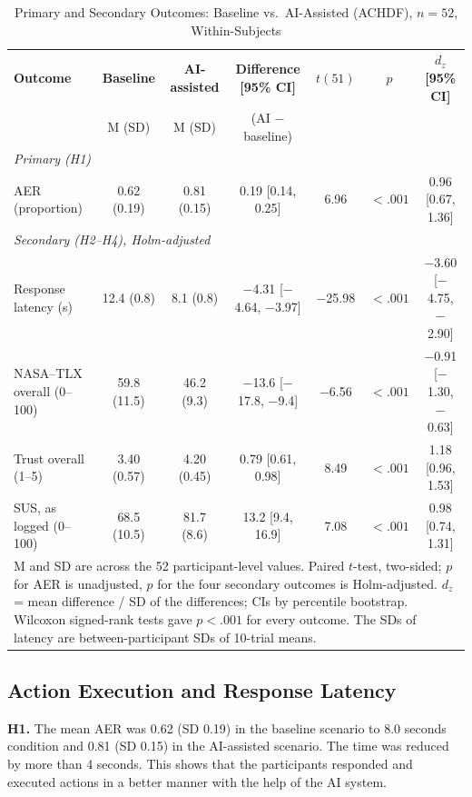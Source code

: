 \documentclass[journal]{IEEEtran}
\theoremstyle{plain}
\theoremstyle{definition}
\providecommand{\DIFaddtex}[1]{{\protect\color{blue} \sf #1}} %
\providecommand{\DIFdeltex}[1]{{\protect\color{red} \scriptsize #1}} %
\providecommand{\DIFaddbegin}{} %
\providecommand{\DIFaddend}{} %
\providecommand{\DIFdelbegin}{} %
\providecommand{\DIFdelend}{} %
\providecommand{\DIFadd}[1]{\texorpdfstring{\DIFaddtex{#1}}{#1}} %
\providecommand{\DIFdel}[1]{\texorpdfstring{\DIFdeltex{#1}}{}} %
\newcommand{\DIFscaledelfig}{0.5}
\newlength{\DIFdelgraphicswidth} %
\newlength{\DIFdelgraphicsheight} %
\newcommand{\DIFaddincludegraphics}[2][]{{\color{blue}\fbox{\DIFOincludegraphics[#1]{#2}}}} %
\newcommand{\DIFdelincludegraphics}[2][]{%
\sbox{\DIFdelgraphicsbox}{\DIFOincludegraphics[#1]{#2}}%
\settoboxwidth{\DIFdelgraphicswidth}{\DIFdelgraphicsbox} %
\settoboxtotalheight{\DIFdelgraphicsheight}{\DIFdelgraphicsbox} %
\scalebox{\DIFscaledelfig}{%
\parbox[b]{\DIFdelgraphicswidth}{\usebox{\DIFdelgraphicsbox}\\[-\baselineskip] \rule{\DIFdelgraphicswidth}{0em}}\llap{\resizebox{\DIFdelgraphicswidth}{\DIFdelgraphicsheight}{%
\setlength{\unitlength}{\DIFdelgraphicswidth}%
\begin{picture}(1,1)%
\thicklines\linethickness{2pt} %
{\color[rgb]{1,0,0}\put(0,0){\framebox(1,1){}}}%
{\color[rgb]{1,0,0}\put(0,0){\line( 1,1){1}}}%
{\color[rgb]{1,0,0}\put(0,1){\line(1,-1){1}}}%
\end{picture}%
}\hspace*{3pt}}} %
} %
\DeclareRobustCommand{\DIFaddbegin}{\DIFOaddbegin \let\includegraphics\DIFaddincludegraphics} %
\DeclareRobustCommand{\DIFaddend}{\DIFOaddend \let\includegraphics\DIFOincludegraphics} %
\DeclareRobustCommand{\DIFdelbegin}{\DIFOdelbegin \let\includegraphics\DIFdelincludegraphics} %
\DeclareRobustCommand{\DIFdelend}{\DIFOaddend \let\includegraphics\DIFOincludegraphics} %
\begin{document}
    \begin{table}[t]
        \caption{Primary and Secondary Outcomes: Baseline vs.\ AI-Assisted (ACHDF), $n=52$, Within-Subjects}
        \label{tab:primary}
        \centering
        \begin{tabular}{l c c c c c c}
            \toprule
            \textbf{Outcome} & \textbf{Baseline} & \textbf{AI-assisted} & \textbf{Difference [95\% CI]} & \textbf{$t(51)$} & \textbf{$p$} & \textbf{$d_z$ [95\% CI]} \\
            & M (SD) & M (SD) & (AI $-$ baseline) & & & \\
            \midrule
            \multicolumn{7}{l}{\emph{Primary (H1)}} \\
            AER (proportion) & 0.62 (0.19) & 0.81 (0.15) & 0.19 [0.14, 0.25] & 6.96 & $<.001$ & 0.96 [0.67, 1.36] \\
            \midrule
            \multicolumn{7}{l}{\emph{Secondary (H2--H4), Holm-adjusted}} \\
            Response latency (s) & 12.4 (0.8) & 8.1 (0.8) & $-$4.31 [$-$4.64, $-$3.97] & $-$25.98 & $<.001$ & $-$3.60 [$-$4.75, $-$2.90] \\
            NASA--TLX overall (0--100) & 59.8 (11.5) & 46.2 (9.3) & $-$13.6 [$-$17.8, $-$9.4] & $-$6.56 & $<.001$ & $-$0.91 [$-$1.30, $-$0.63] \\
            Trust overall (1--5) & 3.40 (0.57) & 4.20 (0.45) & 0.79 [0.61, 0.98] & 8.49 & $<.001$ & 1.18 [0.96, 1.53] \\
            SUS, as logged (0--100) & 68.5 (10.5) & 81.7 (8.6) & 13.2 [9.4, 16.9] & 7.08 & $<.001$ & 0.98 [0.74, 1.31] \\
            \bottomrule
            \multicolumn{7}{p{0.95\linewidth}}{\footnotesize M and SD are across the 52 participant-level values. Paired $t$-test, two-sided; $p$ for AER is unadjusted, $p$ for the four secondary outcomes is Holm-adjusted. $d_z$ = mean difference / SD of the differences; CIs by percentile bootstrap. Wilcoxon signed-rank tests gave $p<.001$ for every outcome. The SDs of latency are between-participant SDs of 10-trial means.}
        \end{tabular}
    \end{table}

    \subsection{\DIFadd{Action Execution and Response Latency}}
    \label{sec:res_aer}
    \DIFadd{\textbf{H1.} The mean AER was 0.62 (SD 0.19) }\DIFaddend in the baseline \DIFdelbegin \DIFdel{scenario to 8.0 seconds }\DIFdelend \DIFaddbegin \DIFadd{condition and 0.81 (SD 0.15) }\DIFaddend in the AI-assisted \DIFdelbegin \DIFdel{scenario. The time was reduced by more than 4 seconds. This shows that the participants responded and executed actions in a better manner with the help of the AI system.
}%
\end{document}
